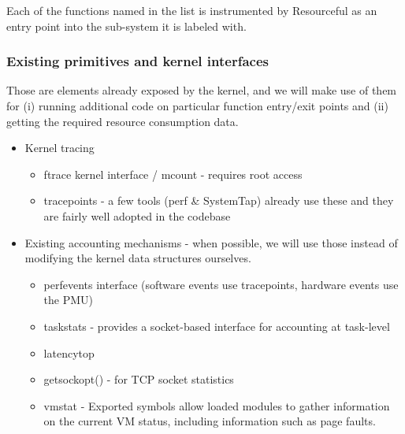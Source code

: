 \documentclass[12pt]{article}
\def\_{\textunderscore\-}
\begin{document}
  Each of the functions named in the list is instrumented by Resourceful as an entry point into the sub-system it is labeled with.
  
  \subsubsection{Existing primitives and kernel interfaces}\label{existingkernel}
  Those are elements already exposed by the kernel, and we will make use of them for (i) running additional code on particular function entry/exit points and (ii) getting the required resource consumption data.
  
  \begin{itemize}
  \item Kernel tracing
  	\begin{itemize}
  	\item ftrace kernel interface / mcount - requires root access
  	\item tracepoints - a few tools (perf \& SystemTap) already use these and they are fairly well adopted in the codebase
  	\end{itemize}
  \item Existing accounting mechanisms - when possible, we will use those instead of modifying the kernel data structures ourselves.
  	\begin{itemize}
  	\item perf\_events interface (software events use tracepoints, hardware events use the PMU)
  	\item taskstats \cite{taskstats} - provides a socket-based interface for accounting at task-level
  	\item latencytop \cite{latencytop}
  	\item getsockopt() - for TCP socket statistics
  	\item vmstat - Exported symbols allow loaded modules to gather information on the current VM status, including information such as page faults.
  	\end{itemize}
  \end{itemize}
  
\end{document}

